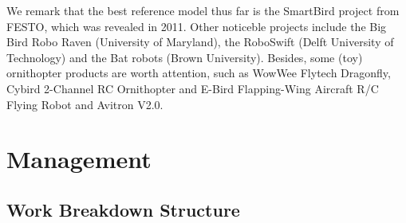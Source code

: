 \documentclass[a4paper, 10pt, twocolumn, titlepage]{article}
\begin{document}
We remark that the best reference model thus far is the SmartBird project from FESTO, which was revealed in 2011.
Other noticeble projects include the Big Bird Robo Raven (University of Maryland), the RoboSwift (Delft University of Technology) and the Bat robots (Brown University).
Besides, some (toy) ornithopter products are worth attention, such as  WowWee Flytech Dragonfly, Cybird 2-Channel RC Ornithopter and E-Bird Flapping-Wing Aircraft R/C Flying Robot and Avitron V2.0.

\section{Management}
\subsection{Work Breakdown Structure}
\end{document}
